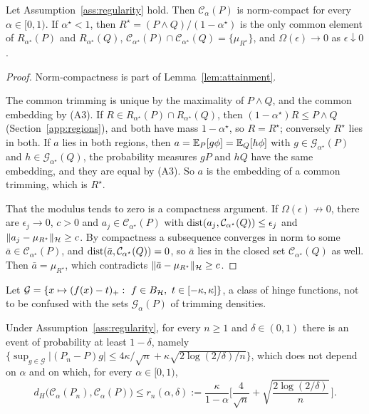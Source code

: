 \begin{lemma}
\label{lem:contact}
Let Assumption~\ref{ass:regularity} hold. Then $\mathcal C_\alpha(P)$ is norm-compact for every $\alpha\in[0,1)$. If
$\alpha^\star<1$, then $R^\star=(P\wedge Q)/(1-\alpha^\star)$ is the only common element of $R_{\alpha^\star}(P)$ and
$R_{\alpha^\star}(Q)$, $\mathcal C_{\alpha^\star}(P)\cap\mathcal C_{\alpha^\star}(Q)=\{\mu_{R^\star}\}$, and
$\Omega(\epsilon)\to0$ as $\epsilon\downarrow0$.
\end{lemma}

\begin{proof}
Norm-compactness is part of Lemma~\ref{lem:attainment}.

The common trimming is unique by the maximality of $P\wedge Q$, and the common embedding by (A3). If $R\in R_{\alpha^\star}(P)\cap R_{\alpha^\star}(Q)$, then $(1-\alpha^\star)R\le P\wedge Q$
(Section~\ref{app:regions}), and both have mass $1-\alpha^\star$, so $R=R^\star$; conversely $R^\star$ lies in both. If $a$ lies in both regions, then
$a=\mathbb{E}_P[g\phi]=\mathbb{E}_Q[h\phi]$ with $g\in\mathcal G_{\alpha^\star}(P)$ and $h\in\mathcal G_{\alpha^\star}(Q)$, the
probability measures $gP$ and $hQ$ have the same embedding, and they are equal by (A3). So $a$ is the embedding of a
common trimming, which is $R^\star$.

That the modulus tends to zero is a compactness argument. If $\Omega(\epsilon)\not\to0$, there are $\epsilon_j\to0$, $c>0$ and
$a_j\in\mathcal C_{\alpha^\star}(P)$ with $\operatorname{dist}(a_j,\mathcal C_{\alpha^\star}(Q))\le\epsilon_j$ and
$\|a_j-\mu_{R^\star}\|_{\mathcal{H}}\ge c$. By compactness a subsequence converges in norm to some
$\bar a\in\mathcal C_{\alpha^\star}(P)$, and $\operatorname{dist}(\bar a,\mathcal C_{\alpha^\star}(Q))=0$, so $\bar a$ lies in the
closed set $\mathcal C_{\alpha^\star}(Q)$ as well. Then $\bar a=\mu_{R^\star}$, which contradicts
$\|\bar a-\mu_{R^\star}\|_{\mathcal{H}}\ge c$.
\end{proof}

Let $\mathcal G=\{x\mapsto(f(x)-t)_+:\ f\in B_{\mathcal{H}},\ t\in[-\kappa,\kappa]\}$, a class of hinge functions, not to be
confused with the sets $\mathcal G_\alpha(P)$ of trimming densities.

\begin{corollary}
\label{cor:uniform}
Under Assumption~\ref{ass:regularity}, for every $n\ge1$ and $\delta\in(0,1)$ there is an event of probability at least
$1-\delta$, namely $\{\sup_{g\in\mathcal G}|(P_n-P)g|\le4\kappa/\sqrt n+\kappa\sqrt{2\log(2/\delta)/n}\}$, which does
not depend on $\alpha$ and on which, for every $\alpha\in[0,1)$,
\begin{equation}
d_H\big(\mathcal C_\alpha(P_n),\mathcal C_\alpha(P)\big)\le r_n(\alpha,\delta)
:=\frac{\kappa}{1-\alpha}\bigg[\frac4{\sqrt n}+\sqrt{\frac{2\log(2/\delta)}n}\,\bigg].
\label{eq:radius}
\end{equation}
\end{corollary}

